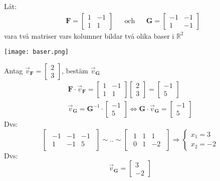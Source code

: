 \begin{Ex}
	Låt:
	\begin{align*}
	&\mathbf{F} = \begin{bmatrix} 1&-1\\1&1 \end{bmatrix}
	&&\text{och}
	&&\mathbf{G} = \begin{bmatrix} -1&-1\\1&-1 \end{bmatrix}
	\end{align*}
	vara två matriser vars kolumner bildar två olika baser i $\mathbb{R}^2$
	\begin{center}
		\texttt{[image: baser.png]}
	\end{center}
	Antag $\vec{v}_{\mathbf{F}} = \begin{bmatrix} 2\\3 \end{bmatrix}$, bestäm $\vec{v}_{\mathbf{G}}$
	\begin{gather*}
		\mathbf{F} \cdot \vec{v}_{\mathbf{F}} = \begin{bmatrix} 1 & -1\\1 & 1 \end{bmatrix} \begin{bmatrix} 2\\3 \end{bmatrix} = \begin{bmatrix} -1\\5 \end{bmatrix}\\
		\vec{v}_{\mathbf{G}} = \mathbf{G}^{-1} \cdot \begin{bmatrix} -1\\5 \end{bmatrix} \Leftrightarrow \mathbf{G} \cdot \vec{v}_{\mathbf{G}} = \begin{bmatrix} -1\\5 \end{bmatrix}
	\end{gather*}
	Dvs:
	\[
	\begin{bmatrix}
	\begin{array}{cc|c}
	    -1 & -1 & -1\\
	    1 & -1 & 5
	\end{array}
	\end{bmatrix}
	\sim .. \sim
	\begin{bmatrix}
	\begin{array}{cc|c}
	    1 & 1 & 1\\
	    0 & 1 & -2
	\end{array}
	\end{bmatrix}
	\Rightarrow
	\begin{cases}
		x_1 = 3\\
		x_2 = -2
	\end{cases}
	\]
	Dvs:
	\[
	\vec{v}_{\mathbf{G}} = \begin{bmatrix} 3\\-2 \end{bmatrix}
	\]
\end{Ex}

